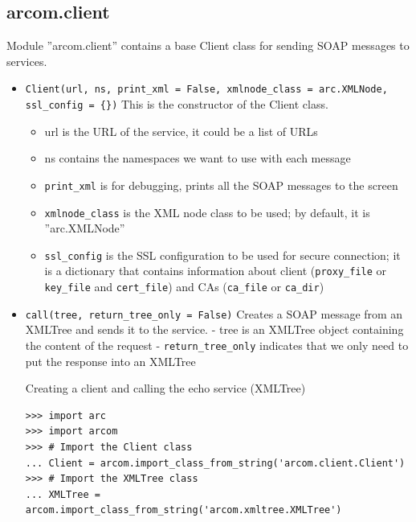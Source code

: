 \documentclass{article}
\begin{document}
\begin{flushleft}
\end{flushleft}

\subsection{arcom.client}
\label{aclient}
Module ''arcom.client'' contains a base Client class for sending SOAP messages to services.
\begin{flushleft}
\begin{itemize}
  \item{ \verb$Client(url, ns, print_xml = False, xmlnode_class = arc.XMLNode, ssl_config = {})$\newline
  This is the constructor of the Client class.
  \begin{itemize}
    \item{url is the URL of the service, it could be a list of URLs}
    \item{ns contains the namespaces we want to use with each message}
    \item{\verb$print_xml$ is for debugging, prints all the SOAP messages to the screen}
    \item{\verb$xmlnode_class$ is the XML node class to be used; by default, it is ''arc.XMLNode''}
    \item{\verb$ssl_config$ is the SSL configuration to be used for secure connection; it is a dictionary that contains information about client (\verb$proxy_file$ or \verb$key_file$ and \verb$cert_file$) and CAs (\verb$ca_file$ or \verb$ca_dir$)}
  \end{itemize}
  }
\end{itemize}
\begin{itemize}
  \item{ \verb$call(tree, return_tree_only = False)$\newline
    Creates a SOAP message from an XMLTree and sends it to the service. \newline
    - tree is an XMLTree object containing the content of the request \newline
    - \verb$return_tree_only$ indicates that we only need to put the response into an XMLTree
    \begin{example}
      \caption{Creating a client and calling the echo service (XMLTree)}\label{clientex1}
\begin{verbatim}
>>> import arc
>>> import arcom
>>> # Import the Client class
... Client = arcom.import_class_from_string('arcom.client.Client')
>>> # Import the XMLTree class
... XMLTree = arcom.import_class_from_string('arcom.xmltree.XMLTree')

\end{verbatim}
\end{example}}
\end{itemize}
\end{flushleft}
\end{document}
